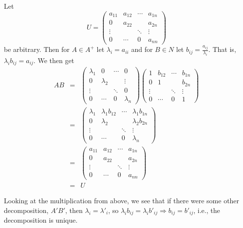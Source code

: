 \documentclass[11pt]{article}
\begin{document}
\begin{enumerate}
Let
\[
U = 
\left(
\begin{array}{cccc}
a_{11} & a_{12} & \cdots & a_{1n} \\
0 & a_{22} & & a_{2n} \\
\vdots & & \ddots & \vdots \\
0 & \cdots & 0 & a_{nn}
\end{array}
\right)
\]
be arbitrary. Then for $A \in A^+$ let $\lambda_i = a_{ii}$ and for $B \in N$ let $b_{ij} = \frac{a_{ij}}{\lambda_i}$.  That is, $\lambda_i b_{ij} = a_{ij}$.  We then get
\begin{eqnarray*}
AB &=&
\left(
\begin{array}{cccc}
\lambda_1 & 0 & \cdots & 0 \\
0 & \lambda_2 & & \vdots \\
\vdots & & \ddots & 0 \\
0 & \cdots & 0 & \lambda_n
\end{array}
\right)
\left(
\begin{array}{cccc}
1 & b_{12} & \cdots & b_{1n} \\
0 & 1 & & b_{2n} \\
\vdots & & \ddots & \vdots \\
0 & \cdots & 0 & 1
\end{array}
\right) \\
&=&
\left(
\begin{array}{cccc}
\lambda_1 & \lambda_1 b_{12} & \cdots & \lambda_1 b_{1n} \\
0 & \lambda_2 & & \lambda_2 b_{2n} \\
\vdots & & \ddots & \vdots \\
0 & \cdots & 0 & \lambda_n
\end{array}
\right) \\
&=& 
\left(
\begin{array}{cccc}
a_{11} & a_{12} & \cdots & a_{1n} \\
0 & a_{22} & & a_{2n} \\
\vdots & & \ddots & \vdots \\
0 & \cdots & 0 & a_{nn}
\end{array}
\right) \\
&=& U
\end{eqnarray*}


Looking at the multiplication from above, we see that if there were some other decomposition, $A'B'$, then $\lambda_i = \lambda'_i$, so $\lambda_i b_{ij} = \lambda_i b'_{ij} \Rightarrow b_{ij} = b'_{ij}$, i.e., the decomposition is unique.


\end{enumerate}
\end{document}

